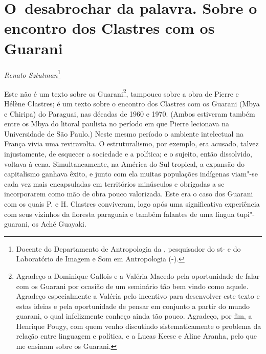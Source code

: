 \chapter{O~desabrochar da palavra. Sobre o encontro dos Clastres com os
Guarani}
\begin{flushright}
\emph{Renato Sztutman}\footnote{Docente do Departamento de Antropologia da ,
pesquisador do st- e do Laboratório de Imagem e Som em
Antropologia (-).}
\end{flushright}
\medskip

\noindent Este não é um texto sobre os Guarani\footnote{Agradeço a Dominique
Gallois e a Valéria Macedo pela oportunidade de falar com os Guarani
por ocasião de um seminário tão bem vindo como aquele. Agradeço
especialmente a Valéria pelo incentivo para desenvolver este texto e
estas ideias e pela oportunidade de pensar em conjunto a partir do
mundo guarani, o qual infelizmente conheço ainda tão pouco. Agradeço,
por fim, a Henrique Pougy, com quem venho discutindo sistematicamente o
problema da relação entre linguagem e política, e a Lucas Keese e Aline
Aranha, pelo que me ensinam sobre os Guarani.}, tampouco sobre a obra
de Pierre e Hélène Clastres; é um texto sobre o encontro dos Clastres
com os Guarani (Mbya e Chiripa) do Paraguai, nas décadas de 1960 e
1970. (Ambos estiveram também entre os Mbya do litoral paulista no
período em que Pierre lecionava na Universidade de São Paulo.) Neste
mesmo período o ambiente intelectual na França vivia uma reviravolta. O
estruturalismo, por exemplo, era acusado, talvez injustamente, de
esquecer a sociedade e a política; e o sujeito, então dissolvido,
voltava à cena. Simultaneamente, na América do Sul tropical, a expansão
do capitalismo ganhava êxito, e junto com ela muitas populações
indígenas viam"-se cada vez mais encapsuladas em territórios minúsculos
e obrigadas a se incorporarem como mão de obra pouco valorizada. Este
era o caso dos Guarani com os quais P. e H. Clastres conviveram, logo
após uma significativa experiência com seus vizinhos da floresta
paraguaia e também falantes de uma língua tupi"-guarani, os Aché
Guayaki.

